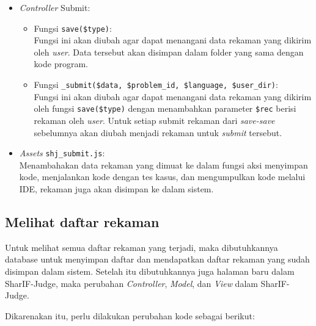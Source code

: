 \begin{itemize}
    \item \textit{Controller} Submit:
        \begin{itemize}
            \item Fungsi \verb|save($type)|: \\
            Fungsi ini akan diubah agar dapat menangani data rekaman yang dikirim oleh \textit{user}. Data tersebut akan disimpan dalam folder yang sama dengan kode program.
            \item Fungsi \verb|_submit($data, $problem_id, $language, $user_dir)|: \\
            Fungsi ini akan diubah agar dapat menangani data rekaman yang dikirim oleh fungsi \verb|save($type)| dengan menambahkan parameter \verb|$rec| berisi rekaman oleh \textit{user}. Untuk setiap submit rekaman dari \textit{save-save} sebelumnya akan diubah menjadi rekaman untuk \textit{submit} tersebut.
        \end{itemize}
    \item \textit{Assets} \verb|shj_submit.js|: \\
        Menambahakan data rekaman yang dimuat ke dalam fungsi aksi menyimpan kode, menjalankan kode dengan tes kasus, dan mengumpulkan kode melalui IDE, rekaman juga akan disimpan ke dalam sistem.
\end{itemize}

\subsection{Melihat daftar rekaman}
\label{sub:4:3:melihatdaftarrekaman}

Untuk melihat semua daftar rekaman yang terjadi, maka dibutuhkannya database untuk menyimpan daftar dan mendapatkan daftar rekaman yang sudah disimpan dalam sistem. Setelah itu dibutuhkannya juga halaman baru dalam SharIF-Judge, maka perubahan \textit{Controller}, \textit{Model}, dan \textit{View} dalam SharIF-Judge.

Dikarenakan itu, perlu dilakukan perubahan kode sebagai berikut:

